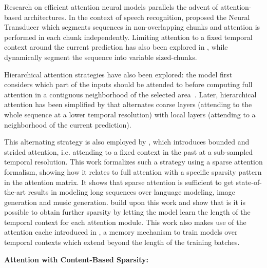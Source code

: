 Research on efficient attention neural models parallels the advent of attention-based architectures. In the context of speech recognition, \citet{jaitly2016online} proposed the Neural Transducer which segments sequences in non-overlapping chunks and attention is performed in each chunk independently. Limiting attention to a fixed temporal context around the current prediction has also been explored in
\citet{chorowski2015attention}, while \citet{chiu2018monotonic} dynamically segment the sequence into variable sized-chunks.

Hierarchical attention strategies have also been explored: the model first considers which part of the inputs should be attended to before computing full attention in a contiguous neighborhood of the selected area~\citep{gregor2015draw,vinyals2015show,luong2015effective}. Later, hierarchical attention has been simplified by \citet{liu2018generating} that alternates coarse layers (attending to the whole sequence at a lower temporal resolution) with local layers (attending to a neighborhood of the current prediction).

This alternating strategy is also employed by \citet{child2019generating}, which introduces bounded and strided attention, i.e. attending to a fixed context in the past at a sub-sampled temporal resolution. This work formalizes such a strategy using a sparse attention formalism, showing how it relates to full attention with a specific sparsity pattern in the attention matrix. It shows that sparse attention is sufficient to get state-of-the-art results in modeling long sequences over language modeling, image generation and music generation. \citet{sukhbaatar2019adaptive}
build upon this work and show that is it is possible to obtain further sparsity by letting the model learn the length of the temporal context for each attention module. This work also makes use of the attention cache introduced in 
\citet{dai2019transformer}, a memory mechanism to train models over temporal contexts which extend beyond the length of the training batches.

{\bf Attention with Content-Based Sparsity:} 

